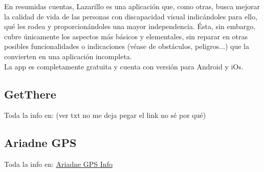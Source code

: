 \documentclass{article}
\begin{document}
	En resumidas cuentas, Lazarillo es una aplicación que, como otras, busca mejorar la calidad de vida de las personas con discapacidad visual indicándoles para ello, qué les rodea y proporcionándoles una mayor independencia. Ésta, sin embargo, cubre únicamente los aspectos más básicos y elementales, sin reparar en otras posibles funcionalidades o indicaciones (véase de obstáculos, peligros...) que la convierten en una aplicación incompleta.
	\\
	La app es completamente gratuita y cuenta con versión para Android y iOs.
	
	
	
	
	\subsection{GetThere}
	Toda la info en: (ver txt no me deja pegar el link no sé por qué)
	 
	
	\subsection{Ariadne GPS}
	Toda la info en:
	\textcolor{blue}{\href{http://www.ariadnegps.eu/}{Ariadne GPS Info}}
 
	
\end{document}
